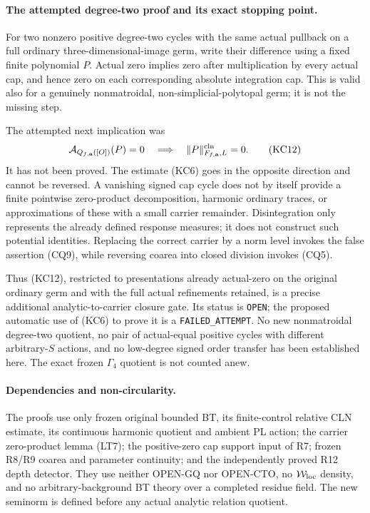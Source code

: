 \documentclass[11pt,a4paper]{article}
\numberwithin{equation}{section}
\theoremstyle{definition}
\theoremstyle{remark}
\begin{document}
\paragraph{The attempted degree-two proof and its exact stopping point.}
For two nonzero positive degree-two cycles with the same actual
pullback on a full ordinary three-dimensional-image germ, write
their difference using a fixed finite polynomial \(P\).
Actual zero implies zero after multiplication by every actual cap,
and hence zero on each corresponding absolute integration cap.
This is valid also for a genuinely nonmatroidal,
non-simplicial-polytopal germ; it is not the missing step.

The attempted next implication was
\[
 \mathcal A_{Q_{f,\mathbf a}([O])}(P)=0
       \quad\Longrightarrow\quad
                       \|P\|^{\rm cln}_{F_{f,\mathbf a},L}=0.
 \tag{KC12}
\]
It has not been proved. The estimate (KC6) goes in the opposite
direction and cannot be reversed. A vanishing signed cap cycle
does not by itself provide a finite pointwise zero-product
decomposition, harmonic ordinary traces, or approximations of
these with a small carrier remainder. Disintegration only
represents the already defined response measures; it does not
construct such potential identities. Replacing the correct
carrier by a norm level invokes the false assertion (CQ9),
while reversing coarea into closed division invokes (CQ5).

Thus (KC12), restricted to presentations already actual-zero on
the original ordinary germ and with the full actual refinements
retained, is a precise additional analytic-to-carrier closure
gate. Its status is \texttt{OPEN}; the proposed automatic use
of (KC6) to prove it is a \texttt{FAILED\_ATTEMPT}.
No new nonmatroidal degree-two quotient, no pair of actual-equal
positive cycles with different arbitrary-\(S\) actions, and no
low-degree signed order transfer has been established here.
The exact frozen \(\Gamma_4\) quotient is not counted anew.

\paragraph{Dependencies and non-circularity.}
The proofs use only frozen original bounded BT, its finite-control
relative CLN estimate, its continuous harmonic quotient and
ambient PL action; the carrier zero-product lemma (LT7);
the positive-zero cap support input of R7; frozen R8/R9 coarea
and parameter continuity; and the independently proved R12
depth detector. They use neither OPEN-GQ nor OPEN-CTO, no
\(\mathcal W_{\rm loc}\) density, and no arbitrary-background
BT theory over a completed residue field. The new seminorm is
defined before any actual analytic relation quotient.
\end{document}

